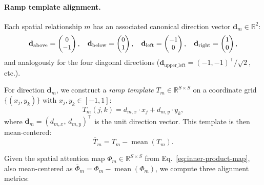 \documentclass[10pt,twocolumn,letterpaper]{article}
\begin{document}
\paragraph{Ramp template alignment.}
Each spatial relationship $m$ has an associated canonical direction vector $\mathbf{d}_m \in \mathbb{R}^2$:
\begin{equation}
\small
    \mathbf{d}_{\text{above}} = \begin{pmatrix} 0 \\ -1 \end{pmatrix}, \quad
    \mathbf{d}_{\text{below}} = \begin{pmatrix} 0 \\ 1 \end{pmatrix}, \quad
    \mathbf{d}_{\text{left}} = \begin{pmatrix} -1 \\ 0 \end{pmatrix}, \quad
    \mathbf{d}_{\text{right}} = \begin{pmatrix} 1 \\ 0 \end{pmatrix},
\end{equation}
and analogously for the four diagonal directions ($\mathbf{d}_{\text{upper\_left}} = (-1, -1)^\top / \sqrt{2}$, etc.).

For direction $\mathbf{d}_m$, we construct a \emph{ramp template} $T_m \in \mathbb{R}^{S \times S}$ on a coordinate grid $\{(x_j, y_k)\}$ with $x_j, y_k \in [-1, 1]$:
\begin{equation}
    T_m(j,k) = d_{m,x} \cdot x_j + d_{m,y} \cdot y_k,
\end{equation}
where $\mathbf{d}_m = (d_{m,x},\, d_{m,y})^\top$ is the unit direction vector. This template is then mean-centered:
\begin{equation}
    \bar{T}_m = T_m - \operatorname{mean}(T_m).
\end{equation}

Given the spatial attention map $\Phi_m \in \mathbb{R}^{S \times S}$ from Eq.~\eqref{eq:inner-product-map}, also mean-centered as $\bar{\Phi}_m = \Phi_m - \operatorname{mean}(\Phi_m)$, we compute three alignment metrics:
\end{document}
